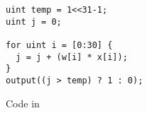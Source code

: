 \begin{figure}
\begin{verbatim}
uint temp = 1<<31-1;
uint j = 0;

for uint i = [0:30] {
  j = j + (w[i] * x[i]);
}
output((j > temp) ? 1 : 0);

\end{verbatim}
\caption{Code in \tool}
\end{figure}